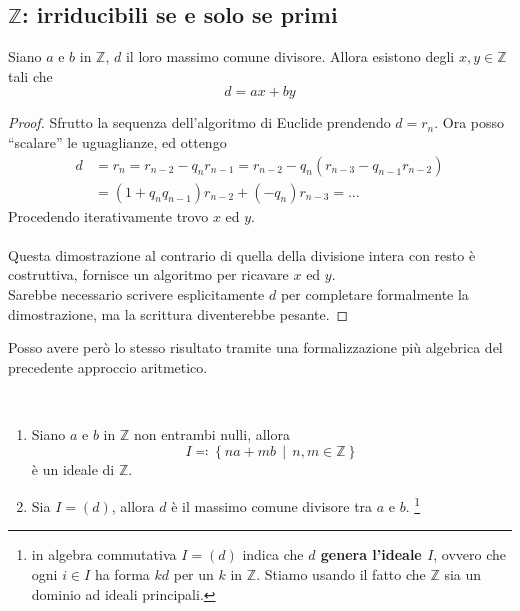 \subsection{$\mathbb{Z}$: irriducibili se e solo se primi}
\begin{teorema} Siano $a$ e $b$ in $\mathbb{Z}$, $d$ il loro massimo comune divisore. Allora esistono degli $x,y \in \mathbb{Z}$ tali che
	\begin{equation*}
	d=ax+by
	\end{equation*}
\end{teorema}
\begin{proof}
	Sfrutto la sequenza dell'algoritmo di Euclide prendendo $d=r_n$. Ora posso \enquote{scalare} le uguaglianze, ed ottengo
	\begin{align*}
	d &  = r_n = r_{n-2}-q_nr_{n-1}= r_{n-2}-q_n(r_{n-3}-q_{n-1}r_{n-2}) \\ 
	& = (1+q_nq_{n-1})r_{n-2}+(-q_n)r_{n-3} = \dots
	\end{align*}
	Procedendo iterativamente trovo $x$ ed $y$. \\ \\ Questa dimostrazione al contrario di quella della divisione intera con resto è costruttiva, fornisce un algoritmo per ricavare $x$ ed $y$. \\ Sarebbe necessario scrivere esplicitamente $d$ per completare formalmente la dimostrazione, ma la scrittura diventerebbe pesante.
\end{proof}
Posso avere però lo stesso risultato tramite una formalizzazione più algebrica del precedente approccio aritmetico.
\begin{teorema} \
	\begin{enumerate}
		\item Siano $a$ e $b$ in $\mathbb{Z}$ non entrambi nulli, allora 
		\begin{equation*}
		I \eqqcolon \left\{na+mb \, \middle| \, n,m \in \mathbb{Z}\right\}
		\end{equation*}
		è un ideale di $\mathbb{Z}$.
		\item Sia $I = (d)$, allora $d$ è il massimo comune divisore tra $a$ e $b$. \footnote{in algebra commutativa $I=(d)$ indica che \textbf{$d$ genera l'ideale $I$}, ovvero che ogni $i \in I$ ha forma $kd$ per un $k$ in $\mathbb{Z}$. Stiamo usando il fatto che $\mathbb{Z}$ sia un dominio ad ideali principali.}
	\end{enumerate}
\end{teorema}
